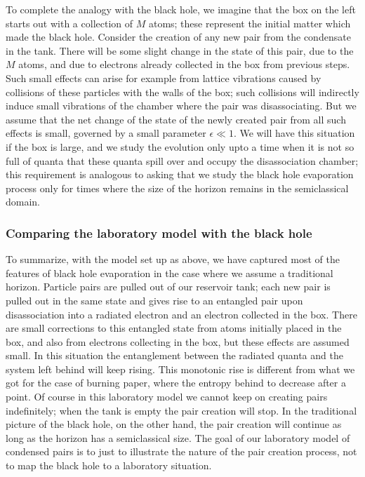 \documentclass[11pt]{article}
\begin{document}
To complete the analogy with the black hole, we imagine that the box on the left starts out with a collection of $M$ atoms; these represent the initial matter which made the black hole. Consider the creation of any new pair from the condensate in the tank. There will be some slight change in the state of this pair, due to the  $M$ atoms, and due to electrons already collected in the box from previous steps. Such small effects can arise for example from lattice vibrations caused by collisions of these particles with the walls of the box; such collisions will indirectly induce small vibrations of the chamber where the pair was disassociating. But we assume that the net change of the state of the newly created pair from all such effects is small, governed by a small parameter $\epsilon\ll 1$. We will have this situation if the box is large, and we study the evolution only upto a time when it is not so full of quanta that these quanta spill over and occupy the disassociation chamber; this requirement is analogous to asking that we study the black hole evaporation process only for times where the size of the horizon remains in the semiclassical domain. 



\subsubsection{Comparing the laboratory model with the black hole}

To summarize, with the model set up as above, we have captured most of the features of black hole evaporation in the case where we assume a traditional horizon. Particle pairs are pulled out of our reservoir tank; each new pair is pulled out in the same state and gives rise to an entangled pair upon disassociation into a radiated electron and an electron collected in the box. There are small corrections to this entangled state from atoms initially placed in the box, and also from electrons collecting in the box, but these effects are assumed small. In this situation the entanglement between the radiated quanta and the system left behind will keep rising. This monotonic rise is different from what we got for the case of burning paper, where the entropy behind to decrease after a point. Of course in this laboratory model we cannot keep on creating pairs indefinitely; when the tank is empty the pair creation will stop. In the traditional picture of the black hole, on the other hand, the pair creation will continue as long as the horizon has a semiclassical size. The goal of our laboratory model of condensed pairs
is to just to illustrate the nature of the pair creation process, not to map the black hole to a laboratory situation. 
\end{document}
